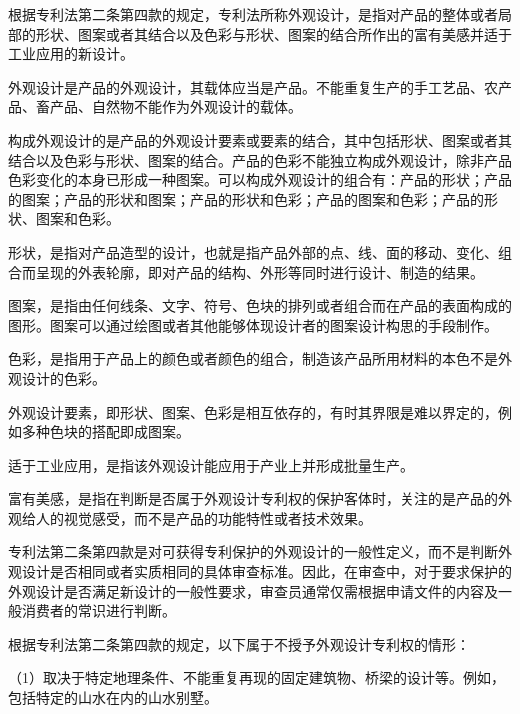 根据专利法第二条第四款的规定，专利法所称外观设计，是指对产品的整体或者局部的形状、图案或者其结合以及色彩与形状、图案的结合所作出的富有美感并适于工业应用的新设计。

外观设计是产品的外观设计，其载体应当是产品。不能重复生产的手工艺品、农产品、畜产品、自然物不能作为外观设计的载体。

构成外观设计的是产品的外观设计要素或要素的结合，其中包括形状、图案或者其结合以及色彩与形状、图案的结合。产品的色彩不能独立构成外观设计，除非产品色彩变化的本身已形成一种图案。可以构成外观设计的组合有：产品的形状；产品的图案；产品的形状和图案；产品的形状和色彩；产品的图案和色彩；产品的形状、图案和色彩。

形状，是指对产品造型的设计，也就是指产品外部的点、线、面的移动、变化、组合而呈现的外表轮廓，即对产品的结构、外形等同时进行设计、制造的结果。

图案，是指由任何线条、文字、符号、色块的排列或者组合而在产品的表面构成的图形。图案可以通过绘图或者其他能够体现设计者的图案设计构思的手段制作。

色彩，是指用于产品上的颜色或者颜色的组合，制造该产品所用材料的本色不是外观设计的色彩。

外观设计要素，即形状、图案、色彩是相互依存的，有时其界限是难以界定的，例如多种色块的搭配即成图案。

适于工业应用，是指该外观设计能应用于产业上并形成批量生产。

富有美感，是指在判断是否属于外观设计专利权的保护客体时，关注的是产品的外观给人的视觉感受，而不是产品的功能特性或者技术效果。

专利法第二条第四款是对可获得专利保护的外观设计的一般性定义，而不是判断外观设计是否相同或者实质相同的具体审查标准。因此，在审查中，对于要求保护的外观设计是否满足新设计的一般性要求，审查员通常仅需根据申请文件的内容及一般消费者的常识进行判断。

根据专利法第二条第四款的规定，以下属于不授予外观设计专利权的情形：

{\setlength{\parindent}{17.1bp}（1）取决于特定地理条件、不能重复再现的固定建筑物、桥梁的设计等。例如，包括特定的山水在内的山水别墅。\par}

